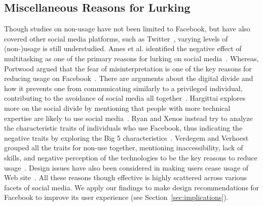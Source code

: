 \subsection{Miscellaneous Reasons for Lurking}
Though studies on non-usage have not been limited to Facebook, but have also covered other social media platforms, such as Twitter~\cite{schoenebeck2014giving}, varying levels of (non-)usage is still understudied. Ames et al. identified the negative effect of multitasking as one of the primary reasons for lurking on social media~\cite{ames2013managing}. Whereas, Portwood argued that the fear of misinterpretation is one of the key reasons for reducing usage on Facebook~\cite{portwood2013media}. There are arguments about the digital divide and how it prevents one from communicating similarly to a privileged individual, contributing to the avoidance of social media all together~\cite{van2005deepening,warschauer2004technology}. Hargittai explores more on the social divide by mentioning that people with more technical expertise are likely to use social media~\cite{hargittai2007whose}. Ryan and Xenos instead try to analyze the characteristic traits of individuals who use Facebook, thus indicating the negative traits by exploring the Big 5 characteristics~\cite{ryan2011uses}. Verdegem and Verhoest grouped all the traits for non-use together, mentioning inaccessibility, lack of skills, and negative perception of the technologies to be the key reasons to reduce usage~\cite{verdegem2009profiling}. Design issues have also been considered in making users cease usage of Web site~\cite{pierce2012undesigning,satchell2009beyond}. All these reasons though effective is highly scattered across various facets of social media. We apply our findings to make design recommendations for Facebook to improve its user experience (see Section~\ref{sec:implications}).

